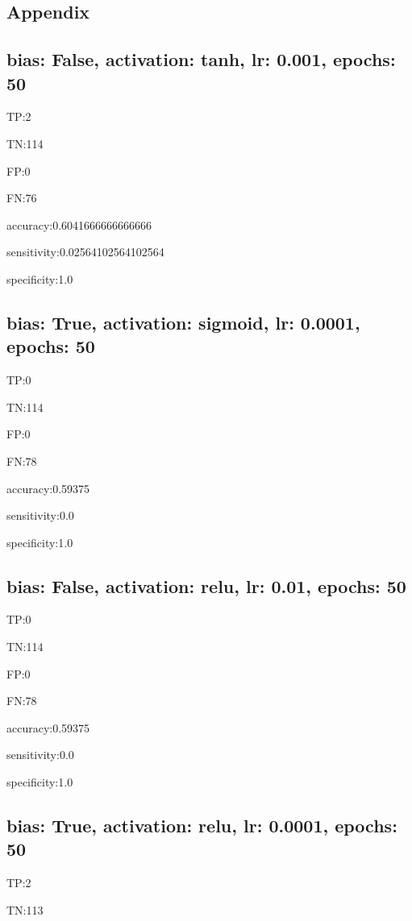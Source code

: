 \documentclass{article}
\begin{document}
\subsection{Appendix}

\subsection{bias: False, activation: tanh, lr: 0.001, epochs: 50}

TP:2

TN:114

FP:0

FN:76

accuracy:0.6041666666666666

sensitivity:0.02564102564102564

specificity:1.0



\subsection{bias: True, activation: sigmoid, lr: 0.0001, epochs: 50}

TP:0

TN:114

FP:0

FN:78

accuracy:0.59375

sensitivity:0.0

specificity:1.0



\subsection{bias: False, activation: relu, lr: 0.01, epochs: 50}

TP:0

TN:114

FP:0

FN:78

accuracy:0.59375

sensitivity:0.0

specificity:1.0



\subsection{bias: True, activation: relu, lr: 0.0001, epochs: 50}

TP:2

TN:113
\end{document}
